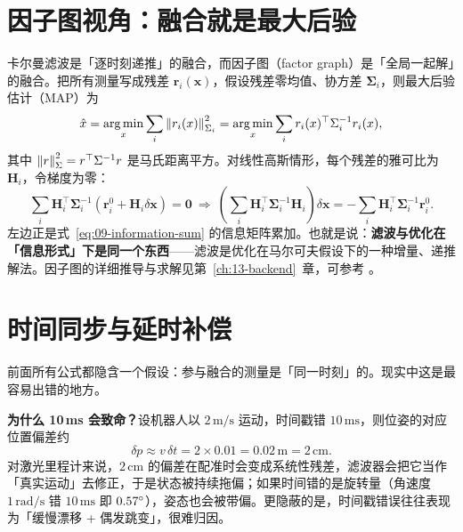 \section{因子图视角：融合就是最大后验}\label{sec:09-factorgraph}

卡尔曼滤波是「逐时刻递推」的融合，而因子图（factor graph）是「全局一起解」的融合。把所有测量写成残差 $\bm{r}_i(\bm{x})$，假设残差零均值、协方差 $\bm{\Sigma}_i$，则最大后验估计（MAP）为
\begin{equation}
  \hat{x} = \operatorname*{arg\,min}_{x}\sum_i\left\lVert r_i(x) \right\rVert_{\Sigma_i}^{2}
  = \operatorname*{arg\,min}_{x}\sum_ir_i(x)^{\top}\Sigma_i^{-1}r_i(x),
  \label{eq:09-map}
\end{equation}
其中 $\left\lVert r \right\rVert^{2}_{\Sigma}=r^{\top}\Sigma^{-1}r$ 是马氏距离平方。对线性高斯情形，每个残差的雅可比为 $\bm{H}_i$，令梯度为零：
\begin{equation}
  \sum_i\bm{H}_i^{\top}\bm{\Sigma}_i^{-1}\left(\bm{r}_i^{0}+\bm{H}_i\delta\bm{x}\right)=\bm{0}
  \ \Longrightarrow\
  \left(\sum_i\bm{H}_i^{\top}\bm{\Sigma}_i^{-1}\bm{H}_i\right)\delta\bm{x}
  = -\sum_i\bm{H}_i^{\top}\bm{\Sigma}_i^{-1}\bm{r}_i^{0}.
  \label{eq:09-gn}
\end{equation}
左边正是式~\eqref{eq:09-information-sum} 的信息矩阵累加。也就是说：\textbf{滤波与优化在「信息形式」下是同一个东西}——滤波是优化在马尔可夫假设下的一种增量、递推解法。因子图的详细推导与求解见第~\ref{ch:13-backend}~章，可参考 \cite{dellaert2017factorgraphs}。

\section{时间同步与延时补偿}\label{sec:09-time}

前面所有公式都隐含一个假设：参与融合的测量是「同一时刻」的。现实中这是最容易出错的地方。

\textbf{为什么 10\,ms 会致命？}设机器人以 $2\,\mathrm{m/s}$ 运动，时间戳错 $10\,\mathrm{ms}$，则位姿的对应位置偏差约
\begin{equation}
  \delta p \approx v\,\delta t = 2\times0.01=0.02\,\mathrm{m}=2\,\mathrm{cm}.
\end{equation}
对激光里程计来说，$2\,\mathrm{cm}$ 的偏差在配准时会变成系统性残差，滤波器会把它当作「真实运动」去修正，于是状态被持续拖偏；如果时间错的是旋转量（角速度 $1\,\mathrm{rad/s}$ 错 $10\,\mathrm{ms}$ 即 $0.57^\circ$），姿态也会被带偏。更隐蔽的是，时间戳错误往往表现为「缓慢漂移 + 偶发跳变」，很难归因。

